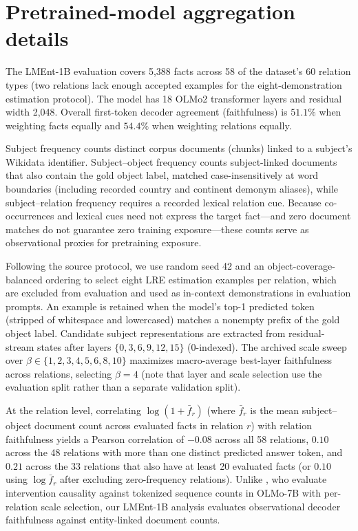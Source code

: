 \section{Pretrained-model aggregation details}
\label{app:lment-frequency}

The LMEnt-1B evaluation covers 5,388 facts across 58 of the dataset's 60
relation types (two relations lack enough accepted examples for the
eight-demonstration estimation protocol). The model has 18 OLMo2 transformer
layers and residual width 2,048. Overall first-token decoder agreement
(faithfulness) is $51.1\%$ when weighting facts equally and $54.4\%$ when
weighting relations equally.

Subject frequency counts distinct corpus documents (chunks) linked to a
subject's Wikidata identifier. Subject--object frequency counts subject-linked
documents that also contain the gold object label, matched case-insensitively at
word boundaries (including recorded country and continent demonym aliases), while
subject--relation frequency requires a recorded lexical relation cue. Because
co-occurrences and lexical cues need not express the target fact---and zero
document matches do not guarantee zero training exposure---these counts serve as
observational proxies for pretraining exposure.

Following the source protocol, we use random seed 42 and an
object-coverage-balanced ordering to select eight LRE estimation examples per
relation, which are excluded from evaluation and used as in-context
demonstrations in evaluation prompts. An example is retained when the model's
top-1 predicted token (stripped of whitespace and lowercased) matches a nonempty
prefix of the gold object label. Candidate subject representations are extracted
from residual-stream states after layers $\{0,3,6,9,12,15\}$ (0-indexed). The
archived scale sweep over $\beta\in\{1,2,3,4,5,6,8,10\}$ maximizes macro-average
best-layer faithfulness across relations, selecting $\beta=4$ (note that layer
and scale selection use the evaluation split rather than a separate validation
split).

At the relation level, correlating $\log(1+\bar f_r)$ (where $\bar f_r$ is the
mean subject--object document count across evaluated facts in relation $r$) with
relation faithfulness yields a Pearson correlation of $-0.08$ across all 58
relations, $0.10$ across the 48 relations with more than one distinct predicted
answer token, and $0.21$ across the 33 relations that also have at least 20
evaluated facts (or $0.10$ using $\log\bar f_r$ after excluding zero-frequency
relations). Unlike \citet{merullo2025frequency}, who evaluate intervention
causality against tokenized sequence counts in OLMo-7B with per-relation scale
selection, our LMEnt-1B analysis evaluates observational decoder faithfulness
against entity-linked document counts.

